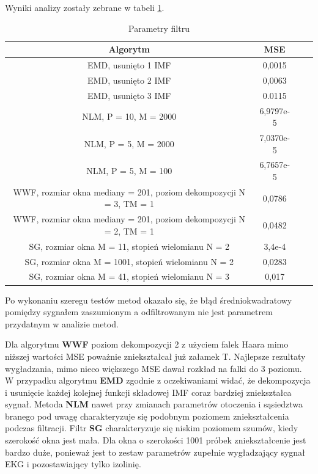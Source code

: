 Wyniki analizy zostały zebrane w tabeli \ref{tab:mse}.


\begin{table}[!htb]
  \centering
  \begin{tabular}{|c|c|c|c|}
  \hline 
  Algorytm  & MSE \\  
  \hline 
  EMD, usunięto 1 IMF & 0,0015 \\
  \hline
  EMD, usunięto 2 IMF  & 0,0063 \\
  \hline
  EMD, usunięto 3 IMF  & 0.0115 \\
  \hline
  NLM, P = 10, M = 2000  & 6,9797e-5 \\
  \hline
  NLM, P = 5, M = 2000  & 7,0370e-5 \\
  \hline
  NLM, P = 5, M = 100  & 6,7657e-5 \\
  \hline
  WWF, rozmiar okna mediany = 201, poziom dekompozycji N = 3, TM = 1  & 0,0786 \\
  \hline
  WWF, rozmiar okna mediany = 201, poziom dekompozycji N = 2, TM = 1  & 0,0482 \\
  \hline
  SG, rozmiar okna M = 11, stopień wielomianu N = 2  & 3,4e-4 \\
  \hline
  SG, rozmiar okna M = 1001, stopień wielomianu N = 2  & 0,0283 \\
  \hline
  SG, rozmiar okna M = 41, stopień wielomianu N = 3  & 0,017 \\
  \hline
\end{tabular} 
\caption{Parametry filtru}
\label{tab:mse}
\end{table}

Po wykonaniu szeregu testów metod okazało się, że błąd średniokwadratowy pomiędzy sygnałem zaszumionym a odfiltrowanym nie jest parametrem przydatnym w analizie metod.

Dla algorytmu \textbf{WWF} poziom dekompozycji 2 z użyciem falek Haara mimo niższej wartości MSE poważnie zniekształcał już załamek T. Najlepsze rezultaty wygładzania, mimo nieco większego MSE dawał rozkład na falki do 3 poziomu. W przypadku algorytmu \textbf{EMD} zgodnie z oczekiwaniami widać, że dekompozycja i usunięcie każdej kolejnej funkcji składowej IMF coraz bardziej zniekształca sygnał. Metoda \textbf{NLM} nawet przy zmianach parametrów otoczenia i sąsiedztwa branego pod uwagę charakteryzuje się podobnym poziomem zniekształcenia podczas filtracji. Filtr \textbf{SG} charakteryzuje się niskim poziomem szumów, kiedy szerokość okna jest mała. Dla okna o szerokości 1001 próbek zniekształcenie jest bardzo duże, ponieważ jest to zestaw parametrów zupełnie wygładzający sygnał EKG i pozostawiający tylko izolinię.
